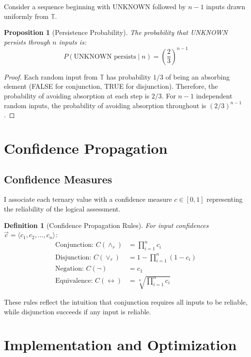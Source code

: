 \documentclass[11pt,a4paper]{article}
\newtheorem{definition}{Definition}
\newtheorem{proposition}{Proposition}
\begin{document}
Consider a sequence beginning with UNKNOWN followed by $n-1$ inputs drawn uniformly from $\mathbb{T}$.

\begin{proposition}[Persistence Probability]
The probability that UNKNOWN persists through $n$ inputs is:
\begin{equation}
P(\text{UNKNOWN persists} \mid n) = \left(\frac{2}{3}\right)^{n-1}
\end{equation}
\end{proposition}

\begin{proof}
Each random input from $\mathbb{T}$ has probability $1/3$ of being an absorbing element (FALSE for conjunction, TRUE for disjunction). Therefore, the probability of avoiding absorption at each step is $2/3$. For $n-1$ independent random inputs, the probability of avoiding absorption throughout is $(2/3)^{n-1}$.
\end{proof}

\section{Confidence Propagation}

\subsection{Confidence Measures}

I associate each ternary value with a confidence measure $c \in [0,1]$ representing the reliability of the logical assessment.

\begin{definition}[Confidence Propagation Rules]
For input confidences $\vec{c} = \langle c_1, c_2, \ldots, c_n \rangle$:
\begin{align}
\text{Conjunction: } C(\land_r) &= \prod_{i=1}^{n} c_i \\
\text{Disjunction: } C(\lor_r) &= 1 - \prod_{i=1}^{n} (1 - c_i) \\
\text{Negation: } C(\neg) &= c_1 \\
\text{Equivalence: } C(\leftrightarrow) &= \sqrt[n]{\prod_{i=1}^{n} c_i}
\end{align}
\end{definition}

These rules reflect the intuition that conjunction requires all inputs to be reliable, while disjunction succeeds if any input is reliable.

\section{Implementation and Optimization}
\end{document}
